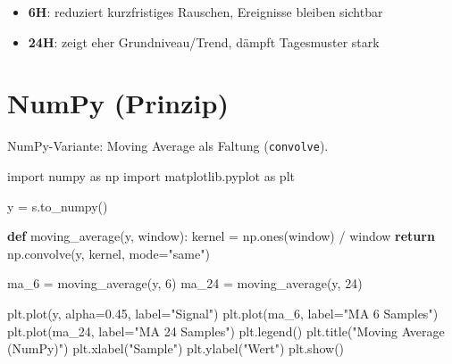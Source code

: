 \documentclass[
  ngerman,
  letterpaper,
  DIV=11]{scrreprt}
\newenvironment{Shaded}{\begin{snugshade}}{\end{snugshade}}
\newcommand{\ControlFlowTok}[1]{\textcolor[rgb]{0.00,0.23,0.31}{\textbf{#1}}}
\newcommand{\DecValTok}[1]{\textcolor[rgb]{0.68,0.00,0.00}{#1}}
\newcommand{\FloatTok}[1]{\textcolor[rgb]{0.68,0.00,0.00}{#1}}
\newcommand{\ImportTok}[1]{\textcolor[rgb]{0.00,0.46,0.62}{#1}}
\newcommand{\KeywordTok}[1]{\textcolor[rgb]{0.00,0.23,0.31}{\textbf{#1}}}
\newcommand{\NormalTok}[1]{\textcolor[rgb]{0.00,0.23,0.31}{#1}}
\newcommand{\OperatorTok}[1]{\textcolor[rgb]{0.37,0.37,0.37}{#1}}
\newcommand{\StringTok}[1]{\textcolor[rgb]{0.13,0.47,0.30}{#1}}
\providecommand{\tightlist}{%
  \setlength{\itemsep}{0pt}\setlength{\parskip}{0pt}}
\begin{document}
\begin{tcolorbox}[enhanced jigsaw, titlerule=0mm, title=\textcolor{quarto-callout-tip-color}{\faLightbulb}\hspace{0.5em}{Entscheidungshilfe}, bottomrule=.15mm, opacityback=0, colbacktitle=quarto-callout-tip-color!10!white, coltitle=black, opacitybacktitle=0.6, colframe=quarto-callout-tip-color-frame, toprule=.15mm, leftrule=.75mm, arc=.35mm, rightrule=.15mm, breakable, bottomtitle=1mm, colback=white, toptitle=1mm, left=2mm]

\begin{itemize}
\tightlist
\item
  \textbf{6H}: reduziert kurzfristiges Rauschen, Ereignisse bleiben
  sichtbar\\
\item
  \textbf{24H}: zeigt eher Grundniveau/Trend, dämpft Tagesmuster stark\\
\end{itemize}

\end{tcolorbox}

\section{NumPy (Prinzip)}

NumPy-Variante: Moving Average als Faltung (\texttt{convolve}).

\begin{Shaded}
\begin{Highlighting}[]
\ImportTok{import}\NormalTok{ numpy }\ImportTok{as}\NormalTok{ np}
\ImportTok{import}\NormalTok{ matplotlib.pyplot }\ImportTok{as}\NormalTok{ plt}

\NormalTok{y }\OperatorTok{=}\NormalTok{ s.to\_numpy()}

\KeywordTok{def}\NormalTok{ moving\_average(y, window):}
\NormalTok{    kernel }\OperatorTok{=}\NormalTok{ np.ones(window) }\OperatorTok{/}\NormalTok{ window}
    \ControlFlowTok{return}\NormalTok{ np.convolve(y, kernel, mode}\OperatorTok{=}\StringTok{"same"}\NormalTok{)}

\NormalTok{ma\_6 }\OperatorTok{=}\NormalTok{ moving\_average(y, }\DecValTok{6}\NormalTok{)}
\NormalTok{ma\_24 }\OperatorTok{=}\NormalTok{ moving\_average(y, }\DecValTok{24}\NormalTok{)}

\NormalTok{plt.plot(y, alpha}\OperatorTok{=}\FloatTok{0.45}\NormalTok{, label}\OperatorTok{=}\StringTok{"Signal"}\NormalTok{)}
\NormalTok{plt.plot(ma\_6, label}\OperatorTok{=}\StringTok{"MA 6 Samples"}\NormalTok{)}
\NormalTok{plt.plot(ma\_24, label}\OperatorTok{=}\StringTok{"MA 24 Samples"}\NormalTok{)}
\NormalTok{plt.legend()}
\NormalTok{plt.title(}\StringTok{"Moving Average (NumPy)"}\NormalTok{)}
\NormalTok{plt.xlabel(}\StringTok{"Sample"}\NormalTok{)}
\NormalTok{plt.ylabel(}\StringTok{"Wert"}\NormalTok{)}
\NormalTok{plt.show()}
\end{Highlighting}
\end{Shaded}
\end{document}
